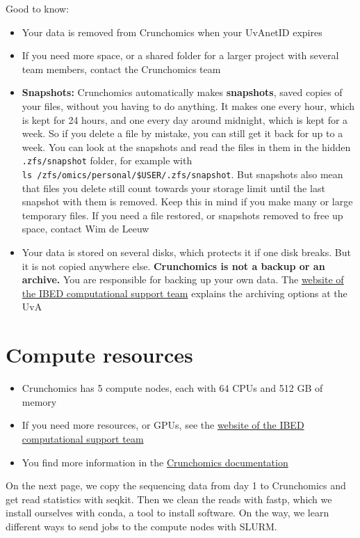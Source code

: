 \documentclass[
  letterpaper,
  DIV=11,
  numbers=noendperiod]{scrreprt}
\providecommand{\tightlist}{%
  \setlength{\itemsep}{0pt}\setlength{\parskip}{0pt}}
\begin{document}
Good to know:

\begin{itemize}
\tightlist
\item
  Your data is removed from Crunchomics when your UvAnetID expires
\item
  If you need more space, or a shared folder for a larger project with
  several team members, contact the Crunchomics team
\item
  \textbf{Snapshots:} Crunchomics automatically makes
  \textbf{snapshots}, saved copies of your files, without you having to
  do anything. It makes one every hour, which is kept for 24 hours, and
  one every day around midnight, which is kept for a week. So if you
  delete a file by mistake, you can still get it back for up to a week.
  You can look at the snapshots and read the files in them in the hidden
  \texttt{.zfs/snapshot} folder, for example with
  \texttt{ls\ /zfs/omics/personal/\$USER/.zfs/snapshot}. But snapshots
  also mean that files you delete still count towards your storage limit
  until the last snapshot with them is removed. Keep this in mind if you
  make many or large temporary files. If you need a file restored, or
  snapshots removed to free up space, contact Wim de Leeuw
\item
  Your data is stored on several disks, which protects it if one disk
  breaks. But it is not copied anywhere else. \textbf{Crunchomics is not
  a backup or an archive.} You are responsible for backing up your own
  data. The
  \href{https://ibed.uva.nl/facilities/computational-facilities/ibed-computational-support-team/ibed-computational-support-team.html}{website
  of the IBED computational support team} explains the archiving options
  at the UvA
\end{itemize}

\section{Compute resources}\label{compute-resources}

\begin{itemize}
\tightlist
\item
  Crunchomics has 5 compute nodes, each with 64 CPUs and 512 GB of
  memory
\item
  If you need more resources, or GPUs, see the
  \href{https://ibed.uva.nl/facilities/computational-facilities/ibed-computational-support-team/ibed-computational-support-team.html}{website
  of the IBED computational support team}
\item
  You find more information in the
  \href{https://crunchomics-documentation.readthedocs.io/en/latest}{Crunchomics
  documentation}
\end{itemize}

On the next page, we copy the sequencing data from day 1 to Crunchomics
and get read statistics with seqkit. Then we clean the reads with fastp,
which we install ourselves with conda, a tool to install software. On
the way, we learn different ways to send jobs to the compute nodes with
SLURM.
\end{document}
